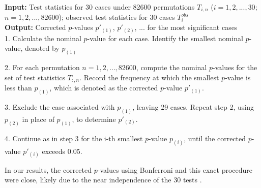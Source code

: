 \documentclass[12pt]{article}
\begin{document}
\begin{algorithm}
\caption{Testing Procedure}
\label{testing}
\textbf{Input:} Test statistics for 30 cases under 82600 permutations $T_{i,n}$ ($i=1,2,...,30$; $n=1,2,...,82600$); observed test statistics for 30 cases $T^{obs}_i$ \\
\textbf{Output:} Corrected $p$-values $p'_{(1)}$, $p'_{(2)}$, ... for the most significant cases\\
1. Calculate the nominal $p$-value for each case. Identify the smallest nominal $p$-value, denoted by $p_{(1)}$

2. For each permutation $n=1,2,\ldots,82600$, compute the nominal $p$-values for the set of test statistics $T_{:,n}$. Record the frequency at which the smallest $p$-value is less than $p_{(1)}$, which is denoted as the corrected $p$-value $p'_{(1)}$.

3. Exclude the case associated with $p_{(1)}$, leaving 29 cases. Repeat step 2, using $p_{(2)}$ in place of $p_{(1)}$, to determine $p'_{(2)}$. 

4. Continue as in step 3 for the i-th smallest $p$-value $p_{(i)}$, until the corrected $p$-value $p'_{(i)}$ exceeds 0.05.

\end{algorithm}

In our results, the corrected $p$-values using Bonferroni and this exact procedure were close, likely due to the near independence of the 30 tests \cite{proschan2011asymptotics}. 
\end{document}
